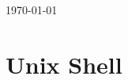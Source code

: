 \documentclass{article}
\begin{document}
\begin{titlepage}
	
	
	\vfill\vfill\vfill %
	
	{\large\today} %
	
	
	 
	
	\vfill %
	
\end{titlepage}


\newpage
  \tableofcontents
\newpage  
{}





\section{Unix Shell}
\end{document}
